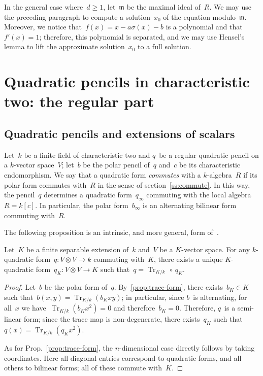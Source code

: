 \documentclass{article}%
\let\fr\mathfrak
\DeclareMathOperator\Tr{Tr}
\begin{document}
In the general case where~$d ≥ 1$, let~$\fr m$ be the maximal ideal
of~$R$. We may use the preceding paragraph to compute a solution~$x_0$ of
the equation modulo~$\fr m$. Moreover, we notice that~$f(x) = x -  a σ(x)
- b$ is a polynomial and that~$f'(x) = 1$; therefore, this polynomial is
separated, and we may use Hensel's lemma to lift the approximate
solution~$x_0$ to a full solution.

\section{Quadratic pencils in characteristic two: the regular part}%
\subsection{Quadratic pencils and extensions of scalars}%
Let~$k$ be a finite field of characteristic two and $q$~be a regular
quadratic pencil on a $k$-vector space~$V$;
let~$b$ be the polar pencil of~$q$ and~$c$ be its characteristic endomorphism.
We say that a quadratic form \emph{commutes} with a $k$-algebra~$R$ if
its polar form commutes with~$R$ in the sense of
section~\ref{ss:commute}.
In this way, the pencil~$q$ determines a quadratic form~$q_{∞}$
commuting with the local algebra~$R = k[c]$.
In particular, the polar form~$b_{∞}$ is an alternating bilinear form
commuting with~$R$.

The following proposition is an intrinsic, and more general, form
of~\cite[Prop.~5]{MPG2013}.

\begin{prop} \label{prop:trace-quad}%
Let~$K$ be a finite separable extension of~$k$ and~$V$ be a $K$-vector
space. For any $k$-quadratic form~$q: V ⊗ V → k$ commuting with~$K$,
there exists a unique $K$-quadratic form~$q_K: V ⊗ V → K$ such that~$q =
\Tr_{K/k} \, ∘ \, q_K$.
\end{prop}

\begin{proof}
Let~$b$ be the polar form of~$q$. By~\ref{prop:trace-form},
there exists~$b_K ∈ K$
such that~$b(x,y) = \Tr_{K/k} (b_K xy)$; in particular, since $b$~is
alternating, for all~$x$ we have~$\Tr_{K/k} (b_K x^2) = 0$ and
therefore~$b_K = 0$. Therefore, $q$~is a semi-linear form; since the
trace map is non-degenerate, there exists~$q_K$ such that~$q(x) =
\Tr_{K/k} (q_K x^2)$.

As for Prop.~\ref{prop:trace-form}, the $n$-dimensional case directly follows by
taking coordinates. Here all diagonal entries correspond to quadratic
forms, and all others to bilinear forms; all of these commute with~$K$.
\end{proof}%
\end{document}
